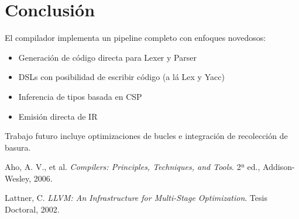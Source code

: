 \documentclass[11pt]{article}
\begin{document}
\section{Conclusión}
El compilador implementa un pipeline completo con enfoques novedosos:

\begin{itemize}
\item Generación de código directa para Lexer y Parser
\item DSLs con posibilidad de escribir código (a lá Lex y Yacc)
\item Inferencia de tipos basada en CSP
\item Emisión directa de IR
\end{itemize}

Trabajo futuro incluye optimizaciones de bucles e integración de recolección de basura.

\begin{thebibliography}{9}
Aho, A. V., et al. \textit{Compilers: Principles, Techniques, and Tools}. 2ª ed., Addison-Wesley, 2006.

Lattner, C. \textit{LLVM: An Infrastructure for Multi-Stage Optimization}. Tesis Doctoral, 2002.
\end{thebibliography}
\end{document}
